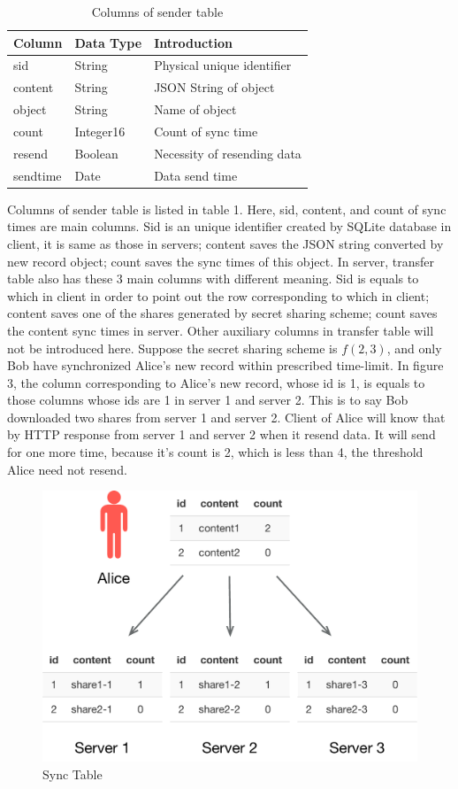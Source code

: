 \documentclass[twocolumn,10pt]{article}
\begin{document}
\begin{table}[tbp]
	\centering  
	\begin{tabular}{lll}  
		\hline
		Column &Data Type & Introduction\\ 
		\hline  
		sid &String & Physical unique identifier\\
		content & String & JSON String of object\\ 
		object & String & Name of object\\
		count & Integer16 & Count of sync time\\
		resend & Boolean &Necessity of resending data \\
		sendtime & Date & Data send time\\
		\hline
	\end{tabular}
	\caption{Columns of sender table}
\end{table}

Columns of sender table is listed in table 1. Here, sid, content, and count of sync times are main columns. Sid is an unique identifier created by SQLite database in client, it is same as those in servers; content saves the JSON string converted by new record object; count saves the sync times of this object. In server, transfer table also has these 3 main columns with different meaning. Sid is equals to which in client in order to point out the row corresponding to which in client; content saves one of the shares generated by secret sharing scheme; count saves the content sync times in server. Other auxiliary columns in transfer table will not be introduced here.
Suppose the secret sharing scheme is $f(2, 3)$, and only Bob have synchronized Alice's new record within prescribed time-limit. In figure 3, the column corresponding to Alice's new record, whose id is 1, is equals to those columns whose ids are 1 in server 1 and server 2. This is to say Bob downloaded two shares from server 1 and server 2. Client of Alice will know that by HTTP response from server 1 and server 2 when it resend data. It will send for one more time, because it's count is 2, which is less than 4, the threshold Alice need not resend.

\begin{figure}[t]
\centering
\includegraphics[scale=0.4]{sync_table}
\caption{Sync Table}
\end{figure}
\end{document}
